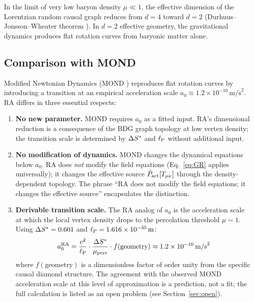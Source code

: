 \documentclass[12pt,a4paper]{article}
\begin{document}
In the limit of very low baryon density $\mu \ll 1$, the effective dimension of the Lorentzian random causal graph reduces from $d=4$ toward $d=2$ (Durhuus--Jonsson--Wheater theorem \cite{Durhuus1995}).  In $d=2$ effective geometry, the gravitational dynamics produces flat rotation curves from baryonic matter alone.

\subsection{Comparison with MOND}\label{sec:mond}

Modified Newtonian Dynamics (MOND \cite{Milgrom1983}) reproduces flat rotation curves by introducing a transition at an empirical acceleration scale $a_0 \approx 1.2\times10^{-10}\,\mathrm{m/s}^2$.  RA differs in three essential respects:

\begin{enumerate}
  \item \textbf{No new parameter.} MOND requires $a_0$ as a fitted input.  RA's dimensional reduction is a consequence of the BDG graph topology at low vertex density; the transition scale is determined by $\Delta S^*$ and $\ell_{\mathrm{P}}$ without additional input.
  \item \textbf{No modification of dynamics.} MOND changes the dynamical equations below $a_0$.  RA does \emph{not} modify the field equations (Eq.~\ref{eq:GR} applies universally); it changes the effective source $\hat{P}_{\mathrm{act}}[T_{\mu\nu}]$ through the density-dependent topology.  The phrase ``RA does not modify the field equations; it changes the effective source'' encapsulates the distinction.
  \item \textbf{Derivable transition scale.} The RA analog of $a_0$ is the acceleration scale at which the local vertex density drops to the percolation threshold $\mu\sim1$.  Using $\Delta S^* = 0.601$ and $\ell_{\mathrm{P}} = 1.616\times10^{-35}\,\mathrm{m}$:
        \begin{equation}
          a_0^{\mathrm{RA}} = \frac{c^2}{\ell_{\mathrm{P}}}\cdot\frac{\Delta S^*}{\mu_{\mathrm{perc}}} \cdot f(\text{geometry}) \approx 1.2\times10^{-10}\,\mathrm{m/s}^2
          \label{eq:a0}
        \end{equation}
        where $f(\text{geometry})$ is a dimensionless factor of order unity from the specific causal diamond structure.  The agreement with the observed MOND acceleration scale at this level of approximation is a prediction, not a fit; the full calculation is listed as an open problem (see Section~\ref{sec:open}).
\end{enumerate}
\end{document}
